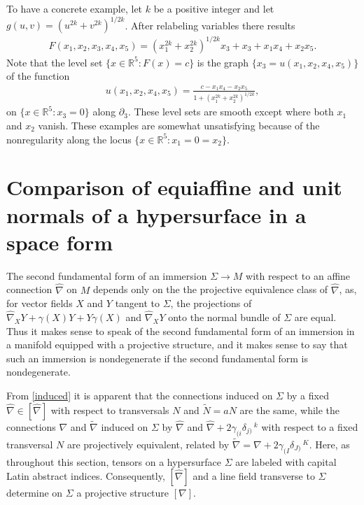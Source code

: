 \documentclass [leqno, 10pt]{amsart}
\theoremstyle{definition}
\numberwithin{equation}{section}
\newcommand{\pr}{\partial}
\newcommand{\en}{[\nabla]}
\newcommand{\ga}{\gamma}
\newcommand{\hnabla}{\widehat{\nabla}}
\newcommand{\tnabla}{\tilde{\nabla}}
\newcommand{\rea}{\mathbb R}
\begin{document}
To have a concrete example, let $k$ be a positive integer and let $g(u, v) = (u^{2k} + v^{2k})^{1/2k}$. After relabeling variables there results
\begin{align}
F(x_{1}, x_{2}, x_{3}, x_{4}, x_{5}) = (x_{1}^{2k} + x_{2}^{2k})^{1/2k}x_{3} + x_{3} + x_{1}x_{4} + x_{2} x_{5}.
\end{align}
Note that the level set $\{x \in \rea^{5}:F(x) = c\}$ is the graph $\{x_{3} = u(x_{1}, x_{2}, x_{4}, x_{5})\}$ of the function 
\begin{align}
u(x_{1}, x_{2}, x_{4}, x_{5}) = \tfrac{c - x_{1}x_{4} - x_{2}x_{5}}{1 + (x_{1}^{2k} + x_{2}^{2k})^{1/2k}},
\end{align}
on $\{x \in \rea^{5}: x_{3} = 0\}$ along $\pr_{3}$. These level sets are smooth except where both $x_{1}$ and $x_{2}$ vanish. These examples are somewhat unsatisfying because of the nonregularity along the locus $\{x \in \rea^{5}: x_{1} = 0 = x_{2}\}$. 

\section{Comparison of equiaffine and unit normals of a hypersurface in a space form}\label{comparisonsection}
The second fundamental form of an immersion $\Sigma \to M$ with respect to an affine connection $\hnabla$ on $M$ depends only on the the projective equivalence class of $\hnabla$, as, for vector fields $X$ and $Y$ tangent to $\Sigma$, the projections of $\hnabla_{X}Y + \ga(X)Y + Y\ga(X)$ and $\hnabla_{X}Y$ onto the normal bundle of $\Sigma$ are equal. Thus it makes sense to speak of the second fundamental form of an immersion in a manifold equipped with a projective structure, and it makes sense to say that such an immersion is nondegenerate if the second fundamental form is nondegenerate.

From \eqref{induced} it is apparent that the connections induced on $\Sigma$ by a fixed $\hnabla \in [\hnabla]$ with respect to transversals $N$ and $\tilde{N} = aN$ are the same, while the connections $\nabla$ and $\tnabla$ induced on $\Sigma$ by $\hnabla$ and $\hnabla + 2\ga_{(i}\delta_{j)}\,^{k}$ with respect to a fixed transversal $N$ are projectively equivalent, related by $\tnabla = \nabla + 2\ga_{(I}\delta_{J)}\,^{K}$. Here, as throughout this section, tensors on a hypersurface $\Sigma$ are labeled with capital Latin abstract indices. Consequently, $[\hnabla]$ and a line field transverse to $\Sigma$ determine on $\Sigma$ a projective structure $\en$.
\end{document}
